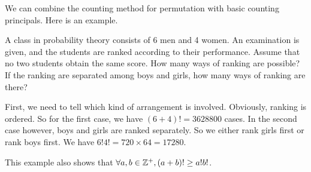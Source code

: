         We can combine the counting method for permutation with basic counting principals.
        Here is an example.
        \begin{example}
        A class in probability theory consists of 6 men and 4 women. An examination is
        given, and the students are ranked according to their performance. Assume that no
        two students obtain the same score. How many ways of ranking are possible?
        If the ranking are separated among boys and girls, how many ways of ranking are
        there?
        \begin{solution}
            First, we need to tell which kind of arrangement is involved. Obviously,
            ranking is ordered.
            So for the first case, we have $(6+4)! = 3628800$ cases.
            In the second case however, boys and girls are ranked separately. So we 
            either rank girls first or rank boys first. We have $6!4! = 720\times 64 =17280$.
        \end{solution}
        \begin{remark}
            This example also shows that \(\forall a,b\in \mathbb{Z}^+, (a+b)! \geq a!b!\).
        \end{remark}
        \end{example}
        

